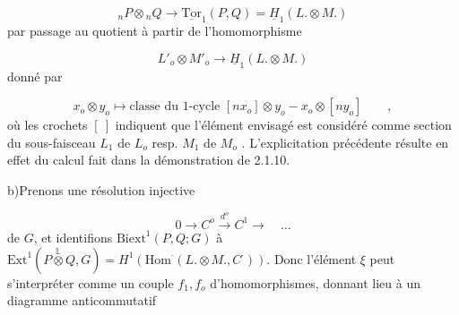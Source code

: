\begin{equation*}
{}_nP \otimes {}_nQ \longrightarrow \underline{\mathrm{Tor}}_1(P,Q) = \underline{H}_1(L.\otimes M.)
\end{equation*}
par passage au quotient à partir de l'homomorphisme

\begin{equation*}
L'_o \otimes M'_o \longrightarrow \underline{H}_1(L.\otimes M.)
\end{equation*}
donné par

\begin{equation*}
x_o \otimes y_o \longmapsto \text{classe du 1-cycle } [nx_o] \otimes y_o - x_o \otimes [ny_o] \qquad ,
\end{equation*}
où les crochets $[\ ]$ indiquent que l'élément envisagé est considéré comme section du sous-faisceau $L_1$ de $L_o$ resp. $M_1$ de $M_o$ . L'explicitation précédente résulte en effet du calcul fait dans la démonstration de 2.1.10.

b)\quad Prenons une résolution injective

\begin{equation*}
0 \longrightarrow C^o \overset{d^o}{\longrightarrow} C^1 \longrightarrow \quad \ldots
\end{equation*}
de $G$, et identifions $\mathrm{Biext}^1(P,Q;G)$ à $\mathrm{Ext}^1(P \overset{\mathbb{L}}{\otimes} Q,G) = H^1(\mathrm{Hom}^{\cdot}(L.\otimes M.,C^{\cdot}))$. Donc l'élément $\xi$ peut s'interpréter comme un couple $f_1,f_o$ d'homomorphismes, donnant lieu à un diagramme anticommutatif 



